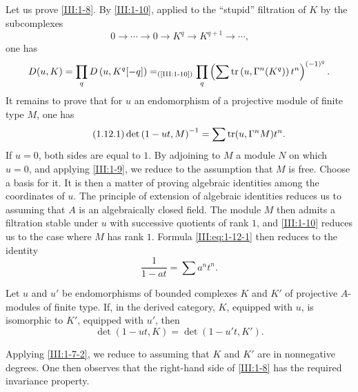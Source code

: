 \subsection{}\label{III:1-12}

Let us prove \ref{III:1-8}. By \ref{III:1-10}, applied to the ``stupid''
filtration of $K$ by the subcomplexes
\[
  0 \to \cdots \to 0 \to K^q \to K^{q+1} \to \cdots \text{,}
\]
one has
\[
  D(u,K) = \prod_q D\left(u,K^q[-q]\right) =_{\text{(\ref{III:1-10})}} \prod_q \left(\sum \operatorname{tr}\left(u,\Gamma^n(K^q)\right) t^n \right)^{(-1)^q} \text{.}
\]
It remains to prove that for $u$ an endomorphism of a projective module of
finite type $M$, one has
\begin{equation*}\tag{1.12.1}\label{III:eq:1-12-1}
  \det\left(1-u t,M\right)^{-1} = \sum \operatorname{tr}(u,\Gamma^n M) t^n \text{.}
\end{equation*}
If $u=0$, both sides are equal to $1$. By adjoining to $M$ a module $N$ on
which $u=0$, and applying \ref{III:1-9}, we reduce to the assumption that $M$
is free. Choose a basis for it. It is then a matter of proving algebraic
identities among the coordinates of $u$. The principle of extension of
algebraic identities reduces us to assuming that $A$ is an algebraically
closed field. The module $M$ then admits a filtration stable under $u$ with
successive quotients of rank $1$, and \ref{III:1-10} reduces us to the case
where $M$ has rank $1$. Formula \eqref{III:eq:1-12-1} then reduces to the
identity
\[
  \frac{1}{1-a t} = \sum a^n t^n \text{.}
\]





\begin{corollary_}\label{III:1-13}
Let $u$ and $u'$ be endomorphisms of bounded complexes $K$ and $K'$ of
projective $A$-modules of finite type. If, in the derived category, $K$,
equipped with $u$, is isomorphic to $K'$, equipped with $u'$, then
\[
  \det(1-u t,K) = \det(1-u' t,K') \text{.}
\]
\end{corollary_}

Applying \ref{III:1-7-2}, we reduce to assuming that $K$ and $K'$ are in
nonnegative degrees. One then observes that the right-hand side of
\ref{III:1-8} has the required invariance property.






\subsection{}\label{III:1-14}

